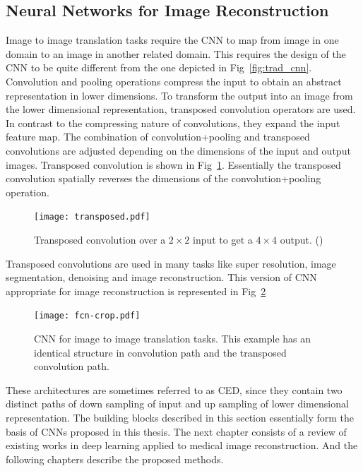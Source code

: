 \subsection{Neural Networks for Image Reconstruction}

Image to image translation tasks require the \ac{CNN} to map from image in one domain to an image in another related domain. This requires the design of the \ac{CNN} to be quite different from the one depicted in Fig~\ref{fig:trad_cnn}. Convolution and pooling operations compress the input to obtain an abstract representation in lower dimensions. To transform the output into an image from the lower dimensional representation, transposed convolution operators are used. In contrast to the compressing nature of convolutions, they expand the input feature map. The combination of convolution+pooling and transposed convolutions are adjusted depending on the dimensions of the input and output images. Transposed convolution is shown in Fig~\ref{fig:tc}. Essentially the transposed convolution spatially reverses the dimensions of the convolution+pooling operation. 

\begin{figure}[!htbp]
	\centering
	\texttt{[image: transposed.pdf]}
	\caption{Transposed convolution over a $2\times2$ input to get a $4\times4$ output. (\cite{dumoulin2016guide})}
	\label{fig:tc}
\end{figure}

Transposed convolutions are used in many tasks like super resolution, image segmentation, denoising and image reconstruction. This version of \ac{CNN} appropriate for image reconstruction is represented in Fig~\ref{fig:fcn}

\begin{figure}[!htbp]
	\centering
	\texttt{[image: fcn-crop.pdf]}
	\caption{\ac{CNN} for image to image translation tasks. This example has an identical structure in convolution path and the transposed convolution path.}
	\label{fig:fcn}
\end{figure}

These architectures are sometimes referred to as \ac{CED}, since they contain two distinct paths of down sampling of input and up sampling of lower dimensional representation. The building blocks described in this section essentially form the basis of \ac{CNN}s proposed in this thesis. The next chapter consists of a review of existing works in deep learning applied to medical image reconstruction. And the following chapters describe the proposed methods. 




